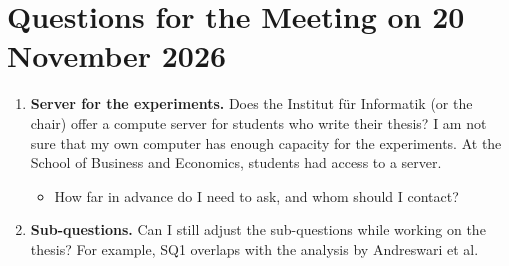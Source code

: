 \section{Questions for the Meeting on 20 November 2026}\label{section::questions_kate}

\begin{enumerate}
  \item \textbf{Server for the experiments.} Does the Institut f\"ur Informatik (or the chair) offer a compute server for students who write their thesis? I am not sure that my own computer has enough capacity for the experiments. At the School of Business and Economics, students had access to a server.
  \begin{itemize}
    \item How far in advance do I need to ask, and whom should I contact?
  \end{itemize}
  \item \textbf{Sub-questions.} Can I still adjust the sub-questions while working on the thesis? For example, SQ1 overlaps with the analysis by Andreswari et al.
\end{enumerate}
